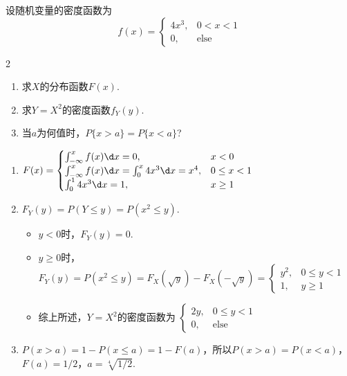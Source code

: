 \begin{problem}
    设随机变量的密度函数为
    \[f(x)=\begin{cases}
        4x^3, & 0<x<1\\
        0, & \text{else}
    \end{cases}\]
    \begin{multicols}{2}
        \begin{enumerate}
            \item 求$X$的分布函数$F(x)$.
            \item 求$Y=X^2$的密度函数$f_Y(y)$.
            \item 当$a$为何值时，$P\{x>a\}=P\{x<a\}$?
        \end{enumerate}
    \end{multicols}
\end{problem}
\begin{solution}\leavevmode
    \begin{enumerate}
        \item 
        $F(x)=\begin{cases}
            \int_{-\infty}^xf(x)\d x=0, & x<0\\
            \int_{-\infty}^xf(x)\d x=\int_0^x4x^3\d x=x^4, & 0\leq x<1\\
            \int_0^14x^3\d x=1, & x\geq1
        \end{cases}$
        \item $F_Y(y)=P(Y\leq y)=P(x^2\leq y)$.
        \begin{itemize}
            \item $y<0$时，$F_Y(y)=0$.
            \item $y\geq0$时，$F_Y(y)=P(x^2\leq y)=F_X(\sqrt y)-F_X(-\sqrt y)=
            \begin{cases}
                y^2, & 0\leq y<1\\
                1, & y\geq1
            \end{cases}$
            \item 综上所述，$Y=X^2$的密度函数为
            $\begin{cases}
                2y, & 0\leq y<1\\
                0, & \text{else}
            \end{cases}$
        \end{itemize}
        \item $P(x>a)=1-P(x\leq a)=1-F(a)$，所以$P(x>a)=P(x<a)$，$F(a)=1/2$，$a=\sqrt[4]{1/2}$.
    \end{enumerate}
\end{solution}

